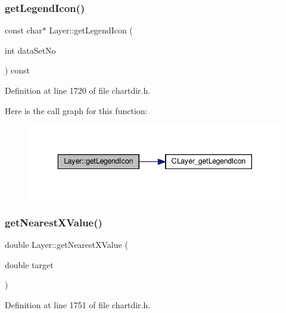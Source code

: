 \subsubsection{\texorpdfstring{get\+Legend\+Icon()}{getLegendIcon()}}
{\footnotesize\ttfamily const char$\ast$ Layer\+::get\+Legend\+Icon (\begin{DoxyParamCaption}\item[{int}]{data\+Set\+No }\end{DoxyParamCaption}) const\hspace{0.3cm}{\ttfamily [inline]}}



Definition at line 1720 of file chartdir.\+h.

Here is the call graph for this function\+:
\nopagebreak
\begin{figure}[H]
\begin{center}
\leavevmode
\includegraphics[width=343pt]{class_layer_aed467bc0e94be04708d50397cd9d068e_cgraph}
\end{center}
\end{figure}
\mbox{\label{class_layer_aec99cc6d249936a4314f8388dc443b3d}} 
\subsubsection{\texorpdfstring{get\+Nearest\+X\+Value()}{getNearestXValue()}}
{\footnotesize\ttfamily double Layer\+::get\+Nearest\+X\+Value (\begin{DoxyParamCaption}\item[{double}]{target }\end{DoxyParamCaption})\hspace{0.3cm}{\ttfamily [inline]}}



Definition at line 1751 of file chartdir.\+h.

